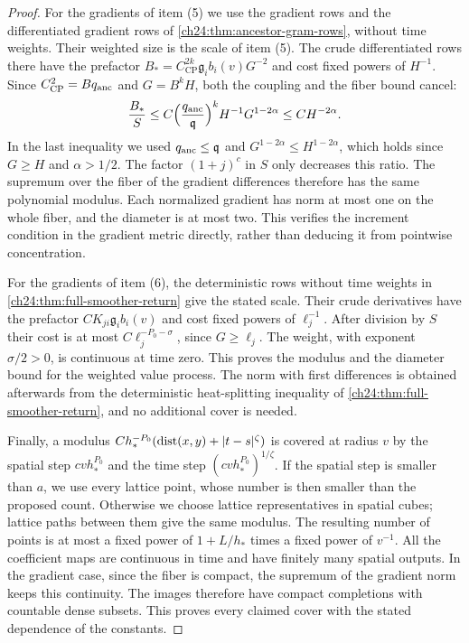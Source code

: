\begin{proof}
For the gradients of item (5) we use the gradient rows and the differentiated gradient rows of \cref{ch24:thm:ancestor-gram-rows}, without time weights. Their weighted size is the scale of item (5). The crude differentiated rows there have the prefactor $B_*=C_{\mathrm{CP}}^{2k}\mathfrak g_ib_i(v)G^{-2}$ and cost fixed powers of $H^{-1}$. Since $C_{\mathrm{CP}}^2=Bq_{\mathrm{anc}}$ and $G=B^kH$, both the coupling and the fiber bound cancel:
\begin{equation}\label{ch30:eq:ancestor-normalization}
 \frac{B_*}{S}\le C\Bigl(\frac{q_{\mathrm{anc}}}{\mathfrak q}\Bigr)^kH^{-1}G^{1-2\alpha}\le CH^{-2\alpha}.
\end{equation}
In the last inequality we used $q_{\mathrm{anc}}\le\mathfrak q$ and $G^{1-2\alpha}\le H^{1-2\alpha}$, which holds since $G\ge H$ and $\alpha>1/2$. The factor $(1+j)^c$ in $S$ only decreases this ratio. The supremum over the fiber of the gradient differences therefore has the same polynomial modulus. Each normalized gradient has norm at most one on the whole fiber, and the diameter is at most two. This verifies the increment condition in the gradient metric directly, rather than deducing it from pointwise concentration.

For the gradients of item (6), the deterministic rows without time weights in \cref{ch24:thm:full-smoother-return} give the stated scale. Their crude derivatives have the prefactor $CK_{ji}\mathfrak g_ib_i(v)$ and cost fixed powers of $\ell_j^{-1}$. After division by $S$ their cost is at most $C\ell_j^{-P_0-\sigma}$, since $G\ge\ell_j$. The weight, with exponent $\sigma/2>0$, is continuous at time zero. This proves the modulus and the diameter bound for the weighted value process. The norm with first differences is obtained afterwards from the deterministic heat-splitting inequality of \cref{ch24:thm:full-smoother-return}, and no additional cover is needed.

Finally, a modulus $Ch_*^{-P_0}(\operatorname{dist}(x,y)+\lvert t-s\rvert^\zeta)$ is covered at radius $v$ by the spatial step $cvh_*^{P_0}$ and the time step $(cvh_*^{P_0})^{1/\zeta}$. If the spatial step is smaller than $a$, we use every lattice point, whose number is then smaller than the proposed count. Otherwise we choose lattice representatives in spatial cubes; lattice paths between them give the same modulus. The resulting number of points is at most a fixed power of $1+L/h_*$ times a fixed power of $v^{-1}$. All the coefficient maps are continuous in time and have finitely many spatial outputs. In the gradient case, since the fiber is compact, the supremum of the gradient norm keeps this continuity. The images therefore have compact completions with countable dense subsets. This proves every claimed cover with the stated dependence of the constants.
\end{proof}

